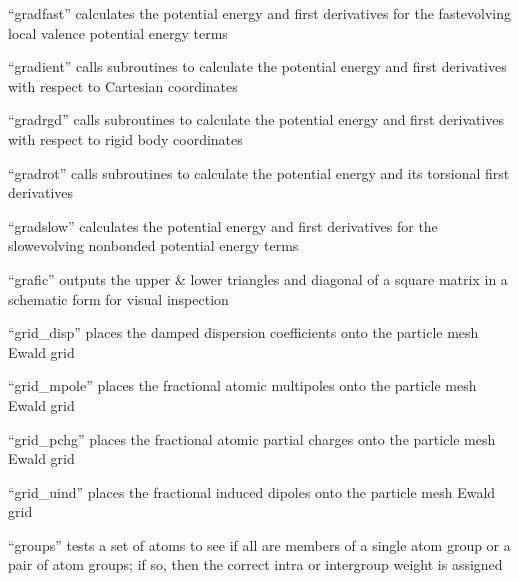 \documentclass[letterpaper,11pt,english]{sphinxmanual}
\begin{document}

“gradfast” calculates the potential energy and first derivatives
for the fast\sphinxhyphen{}evolving local valence potential energy terms


“gradient” calls subroutines to calculate the potential energy
and first derivatives with respect to Cartesian coordinates


“gradrgd” calls subroutines to calculate the potential energy
and first derivatives with respect to rigid body coordinates


“gradrot” calls subroutines to calculate the potential
energy and its torsional first derivatives


“gradslow” calculates the potential energy and first derivatives
for the slow\sphinxhyphen{}evolving nonbonded potential energy terms


“grafic” outputs the upper \& lower triangles and diagonal
of a square matrix in a schematic form for visual inspection


“grid\_disp” places the damped dispersion coefficients onto
the particle mesh Ewald grid


“grid\_mpole” places the fractional atomic multipoles onto
the particle mesh Ewald grid


“grid\_pchg” places the fractional atomic partial charges onto
the particle mesh Ewald grid


“grid\_uind” places the fractional induced dipoles onto the
particle mesh Ewald grid


“groups” tests a set of atoms to see if all are members of a
single atom group or a pair of atom groups; if so, then the
correct intra\sphinxhyphen{} or intergroup weight is assigned
\end{document}
